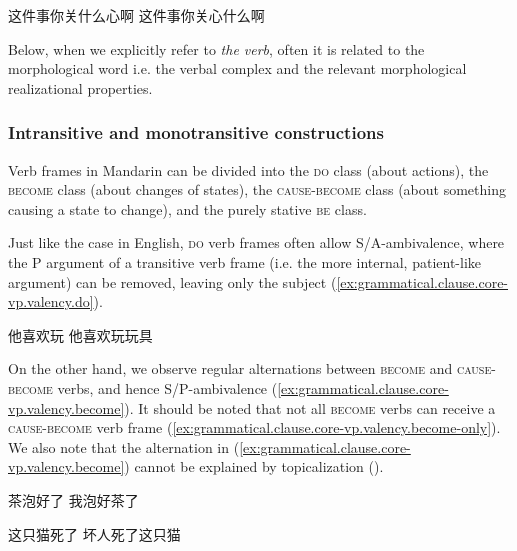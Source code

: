 \documentclass[UTF8, a4paper, oneside, scheme=plain, 12pt]{ctexrep}
\newcommand*{\term}[1]{\emph{#1}}
\newcommand*{\category}[1]{\textsc{#1}}
\begin{document}
\begin{exe}
    \ex\label{ex:grammatical.clause.core-vp.verbal-complex.separable.1} \begin{xlist}
        \ex 这件事你关什么心啊
        \ex 这件事你关心什么啊
    \end{xlist}
\end{exe}
 
Below, when we explicitly refer to \term{the verb},
often it is related to the morphological word i.e. the verbal complex
and the relevant morphological realizational properties.

\subsubsection{Intransitive and monotransitive constructions}\label{sec:grammatical.clause.core-vp.transitivity}

Verb frames in Mandarin can be divided into the \category{do} class (about actions),
the \category{become} class (about changes of states),
the \category{cause}-\category{become} class (about something causing a state to change),
and the purely stative \category{be} class.

Just like the case in English, \category{do} verb frames often allow S/A-ambivalence,
where the P argument of a transitive verb frame (i.e. the more internal, patient-like argument) can be removed, leaving only the subject (\ref{ex:grammatical.clause.core-vp.valency.do}).

\begin{exe}
    \ex\label{ex:grammatical.clause.core-vp.valency.do} \begin{xlist}
        \ex 他喜欢玩
        \ex 他喜欢玩玩具
    \end{xlist}
\end{exe}

On the other hand, we observe regular alternations between \category{become} and \category{cause}-\category{become} verbs,
and hence S/P-ambivalence (\ref{ex:grammatical.clause.core-vp.valency.become}).
It should be noted that not all \category{become} verbs can receive a \category{cause}-\category{become} verb frame (\ref{ex:grammatical.clause.core-vp.valency.become-only}).
We also note that the alternation in (\ref{ex:grammatical.clause.core-vp.valency.become})
cannot be explained by topicalization ().

\begin{exe}
    \ex\label{ex:grammatical.clause.core-vp.valency.become} \begin{xlist}
        \ex\label{ex:grammatical.clause.core-vp.valency.become.1} 茶泡好了
        \ex 我泡好茶了
    \end{xlist}

    \ex\label{ex:grammatical.clause.core-vp.valency.become-only}
    \begin{xlist}
        \ex\label{ex:grammatical.clause.core-vp.valency.become-only.1} 这只猫死了
        \ex *坏人死了这只猫
    \end{xlist}
\end{exe}
\end{document}
